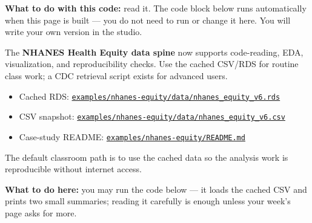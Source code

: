 \documentclass[
  letterpaper,
  DIV=11,
  numbers=noendperiod,
  oneside]{scrreprt}
\providecommand{\tightlist}{%
  \setlength{\itemsep}{0pt}\setlength{\parskip}{0pt}}
\begin{document}
\textbf{What to do with this code:} read it. The code block below runs
automatically when this page is built --- you do not need to run or
change it here. You will write your own version in the studio.

The \textbf{NHANES Health Equity data spine} now supports code-reading,
EDA, visualization, and reproducibility checks. Use the cached CSV/RDS
for routine class work; a CDC retrieval script exists for advanced
users.

\begin{itemize}
\tightlist
\item
  Cached RDS:
  \href{https://github.com/ehsanx/HDSx/blob/main/examples/nhanes-equity/data/nhanes_equity_v6.rds}{\texttt{examples/nhanes-equity/data/nhanes\_equity\_v6.rds}}
\item
  CSV snapshot:
  \href{https://github.com/ehsanx/HDSx/blob/main/examples/nhanes-equity/data/nhanes_equity_v6.csv}{\texttt{examples/nhanes-equity/data/nhanes\_equity\_v6.csv}}
\item
  Case-study README:
  \href{https://github.com/ehsanx/HDSx/blob/main/examples/nhanes-equity/README.md}{\texttt{examples/nhanes-equity/README.md}}
\end{itemize}

The default classroom path is to use the cached data so the analysis
work is reproducible without internet access.

\textbf{What to do here:} you may run the code below --- it loads the
cached CSV and prints two small summaries; reading it carefully is
enough unless your week's page asks for more.
\end{document}

